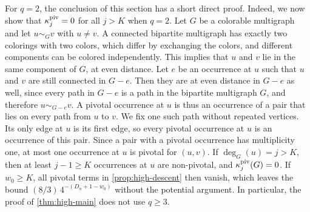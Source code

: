 \begin{remark}\label{rem:high-q2}
For $q = 2$, the conclusion of this section has a short direct proof. Indeed, we now show that $\kappa_j^{\rm piv} = 0$ for all $j > K$ when $q = 2$. Let $G$ be a colorable multigraph and let $u \sim_G v$ with $u \ne v$. A connected bipartite multigraph has exactly two colorings with two colors, which differ by exchanging the colors, and different components can be colored independently. This implies that $u$ and $v$ lie in the same component of $G$, at even distance. Let $e$ be an occurrence at $u$ such that $u$ and $v$ are still connected in $G - e$. Then they are at even distance in $G - e$ as well, since every path in $G - e$ is a path in the bipartite multigraph $G$, and therefore $u \sim_{G - e} v$. A pivotal occurrence at $u$ is thus an occurrence of a pair that lies on every path from $u$ to $v$. We fix one such path without repeated vertices. Its only edge at $u$ is its first edge, so every pivotal occurrence at $u$ is an occurrence of this pair. Since a pair with a pivotal occurrence has multiplicity one, at most one occurrence at $u$ is pivotal for $(u, v)$. If $\deg_G(u) = j > K$, then at least $j - 1 \ge K$ occurrences at $u$ are non-pivotal, and $\kappa_j^{\rm piv}(G) = 0$. If $w_0 \ge K$, all pivotal terms in \cref{prop:high-descent} then vanish, which leaves the bound $(8/3) \, 4^{-(D_n + 1 - w_0)}$ without the potential argument. In particular, the proof of \cref{thm:high-main} does not use $q \ge 3$.
\end{remark}
